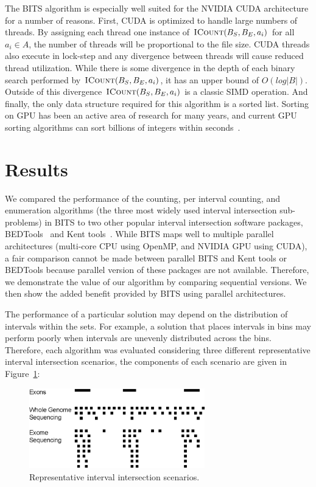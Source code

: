 \documentclass{bioinfo}
\begin{document}
	The BITS algorithm is especially well suited for the NVIDIA CUDA
	architecture for a number of reasons.  First, CUDA is optimized to handle large
	numbers of threads.  By assigning each thread one instance of
	$\textsc{ICount}(B_S,B_E,a_i)$ for all $a_i \in A$, the number of threads will
	be proportional to the file size.  CUDA threads also execute in lock-step and
	any divergence between threads will cause reduced thread utilization.  While
	there is some divergence in the depth of each binary search performed by
	$\textsc{ICount}(B_S,B_E,a_i)$, it has an upper bound of $O(log |B|)$.  Outside of
	this divergence $\textsc{ICount}(B_S,B_E,a_i)$ is a classic SIMD operation.  And
	finally, the only data structure required for this algorithm is a sorted list.
	Sorting on GPU has been an active area of research for many years, and current
	GPU sorting algorithms can sort billions of integers within
	seconds~\citep{merrill2011}.

	\section{Results}

	We compared the performance of the counting, per interval counting, and
	enumeration algorithms (the three most widely used interval intersection
	sub-problems) in BITS to two other popular interval intersection software
	packages, BEDTools~\citep{quinlan2010} and Kent tools~\citep{kent2002}.  While
	BITS maps well to multiple parallel architectures (multi-core CPU using OpenMP,
	and NVIDIA GPU using CUDA), a fair comparison cannot be made between parallel
	BITS and Kent tools or BEDTools because parallel version of these packages are
	not available.  Therefore, we demonstrate the value of our algorithm by
	comparing sequential versions.  We then show the added benefit provided by 
	BITS using parallel architectures.

	The performance of a particular solution may depend on the distribution of
	intervals within the sets.  For example, a solution that places intervals in
	bins may perform poorly when intervals are unevenly distributed across the bins.
	Therefore, each algorithm was evaluated considering three different
	representative interval intersection scenarios, the components of each scenario
	are given in Figure~\ref{distro}:

	\begin{figure}[h]
		\begin{center}
			\includegraphics[width=3in]{figures/data_distribution.eps}\end{center}
			\caption{Representative interval intersection scenarios.}
			\label{distro}
		\end{figure}
\end{document}

